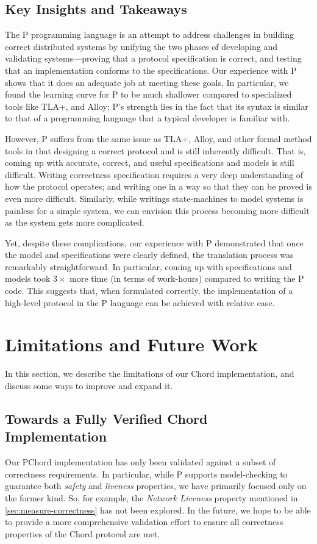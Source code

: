 \documentclass[conference]{IEEEtran}
\begin{document}
\subsection{Key Insights and Takeaways}
\label{sec:insights}
The P programming language is an attempt to address challenges in building correct distributed systems by unifying the two phases of developing and validating systems—proving that a protocol specification is correct, and testing that an implementation conforms to the specifications. Our experience with P shows that it does an adequate job at meeting these goals. In particular, we found the learning curve for P to be much shallower compared to specialized tools like TLA+, and Alloy; P's strength lies in the fact that its syntax is similar to that of a programming language that a typical developer is familiar with.

However, P suffers from the same issue as TLA+, Alloy, and other formal method tools in that designing a correct protocol and is still inherently difficult. That is, coming up with accurate, correct, and useful specifications and models is still difficult. Writing correctness specification requires a very deep understanding of how the protocol operates; and writing one in a way so that they can be proved is even more difficult. Similarly, while writings state-machines to model systems is painless for a simple system, we can envision this process becoming more difficult as the system gets more complicated. 

Yet, despite these complications, our experience with P demonstrated that once the model and specifications were clearly defined, the translation process was remarkably straightforward. In particular, coming up with specifications and models took $3\times$ more time (in terms of work-hours) compared to writing the P code. This suggests that, when formulated correctly, the implementation of a high-level protocol in the P language can be achieved with relative ease.

\section{Limitations and Future Work}
\label{sec:limitations}
In this section, we describe the limitations of our Chord implementation, and discuss some ways to improve and expand it.

\subsection{Towards a Fully Verified Chord Implementation}
\label{sec:towards-full-verification}
Our PChord implementation has only been validated against a subset of correctness requirements. In particular, while P supports model-checking to guarantee both \textit{safety} and \textit{liveness} properties, we have primarily focused only on the former kind. So, for example, the \textit{Network Liveness} property mentioned in \autoref{sec:measure-correctness} has not been explored. In the future, we hope to be able to provide a more comprehensive validation effort to ensure all correctness properties of the Chord protocol are met.
\end{document}
